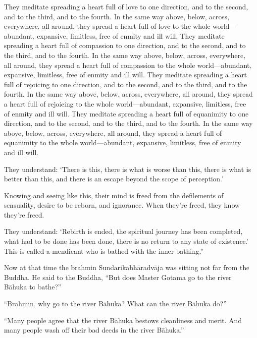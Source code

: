 \documentclass[12pt,openany]{book}%
\begin{document}
They meditate spreading a heart full of love to one direction, and to the second, and to the third, and to the fourth. In the same way above, below, across, everywhere, all around, they spread a heart full of love to the whole world—abundant, expansive, limitless, free of enmity and ill will. They meditate spreading a heart full of compassion to one direction, and to the second, and to the third, and to the fourth. In the same way above, below, across, everywhere, all around, they spread a heart full of compassion to the whole world—abundant, expansive, limitless, free of enmity and ill will. They meditate spreading a heart full of rejoicing to one direction, and to the second, and to the third, and to the fourth. In the same way above, below, across, everywhere, all around, they spread a heart full of rejoicing to the whole world—abundant, expansive, limitless, free of enmity and ill will. They meditate spreading a heart full of equanimity to one direction, and to the second, and to the third, and to the fourth. In the same way above, below, across, everywhere, all around, they spread a heart full of equanimity to the whole world—abundant, expansive, limitless, free of enmity and ill will. 

They understand: ‘There is this, there is what is worse than this, there is what is better than this, and there is an escape beyond the scope of perception.’ 

Knowing and seeing like this, their mind is freed from the defilements of sensuality, desire to be reborn, and ignorance. When they’re freed, they know they’re freed. 

They understand: ‘Rebirth is ended, the spiritual journey has been completed, what had to be done has been done, there is no return to any state of existence.’ This is called a mendicant who is bathed with the inner bathing.” 

Now at that time the brahmin \textsanskrit{Sundarikabhāradvāja} was sitting not far from the Buddha. He said to the Buddha, “But does Master Gotama go to the river \textsanskrit{Bāhuka} to bathe?” 

“Brahmin, why go to the river \textsanskrit{Bāhuka}? What can the river \textsanskrit{Bāhuka} do?” 

“Many people agree that the river \textsanskrit{Bāhuka} bestows cleanliness and merit. And many people wash off their bad deeds in the river \textsanskrit{Bāhuka}.” 
\end{document}
